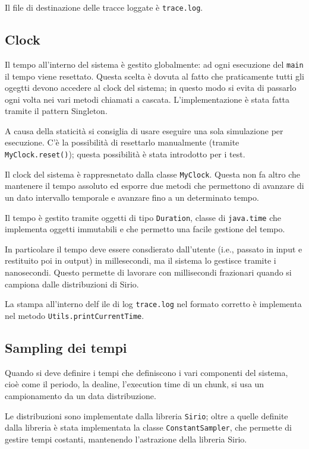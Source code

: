 Il file di destinazione delle tracce loggate è \texttt{trace.log}.

\subsection{Clock}
Il tempo all'interno del sistema è gestito globalmente: ad ogni esecuzione del \texttt{main} il tempo viene resettato. Questa scelta è dovuta al fatto che praticamente tutti gli ogegtti devono accedere al clock del sistema; in questo modo si evita di passarlo ogni volta nei vari metodi chiamati a cascata. L'implementazione è stata fatta tramite il pattern Singleton.

A causa della staticità si consiglia di usare eseguire una sola simulazione per esecuzione. C'è la possibilità di resettarlo manualmente (tramite \texttt{MyClock.reset()}); questa possibilità è stata introdotto per i test.

Il clock del sistema è rappresnetato dalla classe \texttt{MyClock}. Questa non fa altro che mantenere il tempo assoluto ed esporre due metodi che permettono di avanzare di un dato intervallo temporale e avanzare fino a un determinato tempo.

\myskip

Il tempo è gestito tramite oggetti di tipo \texttt{Duration}, classe di \texttt{java.time} che implementa oggetti immutabili e che permetto una facile gestione del tempo.

In particolare il tempo deve essere consdierato dall'utente (i.e., passato in input e restituito poi in output) in millesecondi, ma il sistema lo gestisce tramite i nanosecondi. Questo permette di lavorare con millisecondi frazionari quando si campiona dalle distribuzioni di Sirio.

La stampa all'interno delf ile di log \texttt{trace.log} nel formato corretto è implementa nel metodo \texttt{Utils.printCurrentTime}.

\subsection{Sampling dei tempi}
Quando si deve definire i tempi che definiscono i vari componenti del sistema, cioè come il periodo, la dealine, l'execution time di un chunk, si usa un campionamento da un data distribuzione.

Le distribuzioni sono implementate dalla libreria \texttt{Sirio}; oltre a quelle definite dalla libreria è stata implementata la classe \texttt{ConstantSampler}, che permette di gestire tempi costanti, mantenendo l'astrazione della libreria Sirio.

